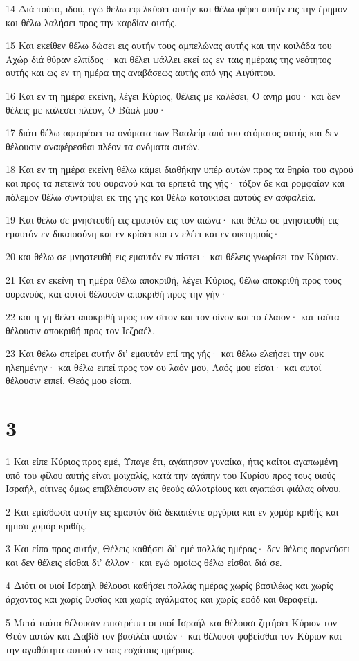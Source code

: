 \par 14 Διά τούτο, ιδού, εγώ θέλω εφελκύσει αυτήν και θέλω φέρει αυτήν εις την έρημον και θέλω λαλήσει προς την καρδίαν αυτής.
\par 15 Και εκείθεν θέλω δώσει εις αυτήν τους αμπελώνας αυτής και την κοιλάδα του Αχώρ διά θύραν ελπίδος· και θέλει ψάλλει εκεί ως εν ταις ημέραις της νεότητος αυτής και ως εν τη ημέρα της αναβάσεως αυτής από γης Αιγύπτου.
\par 16 Και εν τη ημέρα εκείνη, λέγει Κύριος, θέλεις με καλέσει, Ο ανήρ μου· και δεν θέλεις με καλέσει πλέον, Ο Βάαλ μου·
\par 17 διότι θέλω αφαιρέσει τα ονόματα των Βααλείμ από του στόματος αυτής και δεν θέλουσιν αναφέρεσθαι πλέον τα ονόματα αυτών.
\par 18 Και εν τη ημέρα εκείνη θέλω κάμει διαθήκην υπέρ αυτών προς τα θηρία του αγρού και προς τα πετεινά του ουρανού και τα ερπετά της γής· τόξον δε και ρομφαίαν και πόλεμον θέλω συντρίψει εκ της γης και θέλω κατοικίσει αυτούς εν ασφαλεία.
\par 19 Και θέλω σε μνηστευθή εις εμαυτόν εις τον αιώνα· και θέλω σε μνηστευθή εις εμαυτόν εν δικαιοσύνη και εν κρίσει και εν ελέει και εν οικτιρμοίς·
\par 20 και θέλω σε μνηστευθή εις εμαυτόν εν πίστει· και θέλεις γνωρίσει τον Κύριον.
\par 21 Και εν εκείνη τη ημέρα θέλω αποκριθή, λέγει Κύριος, θέλω αποκριθή προς τους ουρανούς, και αυτοί θέλουσιν αποκριθή προς την γήν·
\par 22 και η γη θέλει αποκριθή προς τον σίτον και τον οίνον και το έλαιον· και ταύτα θέλουσιν αποκριθή προς τον Ιεζραέλ.
\par 23 Και θέλω σπείρει αυτήν δι' εμαυτόν επί της γής· και θέλω ελεήσει την ουκ ηλεημένην· και θέλω ειπεί προς τον ου λαόν μου, Λαός μου είσαι· και αυτοί θέλουσιν ειπεί, Θεός μου είσαι.

\chapter{3}

\par 1 Και είπε Κύριος προς εμέ, Ύπαγε έτι, αγάπησον γυναίκα, ήτις καίτοι αγαπωμένη υπό του φίλου αυτής είναι μοιχαλίς, κατά την αγάπην του Κυρίου προς τους υιούς Ισραήλ, οίτινες όμως επιβλέπουσιν εις θεούς αλλοτρίους και αγαπώσι φιάλας οίνου.
\par 2 Και εμίσθωσα αυτήν εις εμαυτόν διά δεκαπέντε αργύρια και εν χομόρ κριθής και ήμισυ χομόρ κριθής.
\par 3 Και είπα προς αυτήν, Θέλεις καθήσει δι' εμέ πολλάς ημέρας· δεν θέλεις πορνεύσει και δεν θέλεις είσθαι δι' άλλον· και εγώ ομοίως θέλω είσθαι διά σε.
\par 4 Διότι οι υιοί Ισραήλ θέλουσι καθήσει πολλάς ημέρας χωρίς βασιλέως και χωρίς άρχοντος και χωρίς θυσίας και χωρίς αγάλματος και χωρίς εφόδ και θεραφείμ.
\par 5 Μετά ταύτα θέλουσιν επιστρέψει οι υιοί Ισραήλ και θέλουσι ζητήσει Κύριον τον Θεόν αυτών και Δαβίδ τον βασιλέα αυτών· και θέλουσι φοβείσθαι τον Κύριον και την αγαθότητα αυτού εν ταις εσχάταις ημέραις.

